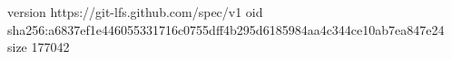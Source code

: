 version https://git-lfs.github.com/spec/v1
oid sha256:a6837ef1e446055331716c0755dff4b295d6185984aa4c344ce10ab7ea847e24
size 177042
